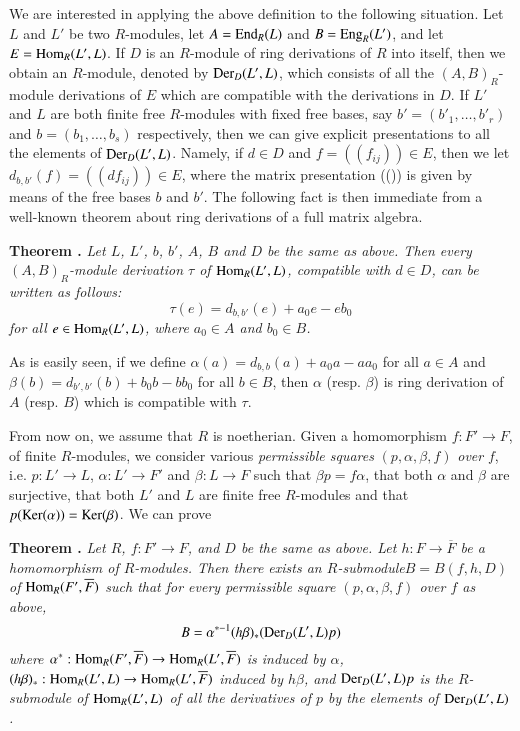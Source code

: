 We are interested in applying the above definition to the following situation. Let $L$ and $L'$ be two $R$-modules, let $A=\operatorname{\mathrm{End}}_{R}(L)$ and $B=\operatorname{\mathrm{Eng}}_{R}(L')$, and let $E=\operatorname{\mathrm{Hom}}_{R}(L',L)$. If $D$ is an $R$-module of ring derivations of $R$ into itself, then we obtain an $R$-module, denoted by $\operatorname{\mathrm{Der}}_{D}(L',L)$, which consists of all the $(A,B)_{R}$-module derivations of $E$ which are compatible with the derivations in $D$. If $L'$ and $L$ are both finite free $R$-modules with fixed free bases, say $b'=(b'_{1},\ldots,b'_{r})$ and $b=(b_{1},\ldots,b_{s})$ respectively, then we can give explicit presentations to all the elements of $\operatorname{\mathrm{Der}}_{D}(L',L)$. Namely, if $d\in D$ and $f=((f_{ij}))\in E$, then we let $d_{b,b'}(f)=((df_{ij}))\in E$, where the matrix presentation ((\quad)) is given by means of the free bases $b$ and $b'$. The following fact is then immediate from a well-known theorem about ring derivations of a full matrix algebra.

\medskip
\noindent
{\bf Theorem .\label{art10-sec1-thm1.3}}
{\em Let $L$, $L'$, $b$, $b'$, $A$, $B$ and $D$ be the same as above. Then every $(A,B)_{R}$-module derivation $\tau$ of $\operatorname{\mathrm{Hom}}_{R}(L',L)$, compatible with $d\in D$, can be written as follows:}
$$
\tau(e)=d_{b,b'}(e)+a_{0}e-eb_{0}
$$
{\em for all $e\in \operatorname{\mathrm{Hom}}_{R}(L',L)$, where $a_{0}\in A$ and $b_{0}\in B$.}
\smallskip

As is easily seen, if we define $\alpha(a)=d_{b,b}(a)+a_{0}a-aa_{0}$ for all $a\in A$ and $\beta(b)=d_{b',b'}(b)+b_{0}b-bb_{0}$ for all $b\in B$, then $\alpha$ (resp. $\beta$) is ring derivation of $A$ (resp. $B$) which is compatible with $\tau$.

From now on, we assume that $R$ is noetherian. Given a homomorphism $f:F'\to F$, of finite $R$-modules, we consider various {\em permissible squares} $(p,\alpha,\beta,f)$ {\em over} $f$, i.e. $p:L'\to L$, $\alpha:L'\to F'$ and $\beta:L\to F$ such that $\beta p=f\alpha$, that both $\alpha$ and $\beta$ are surjective, that both $L'$ and $L$ are finite free $R$-modules and that $p(\operatorname{\mathrm{Ker}}(\alpha))=\operatorname{\mathrm{Ker}}(\beta)$. We can prove

\medskip
\noindent
{\bf Theorem .\label{art10-sec1-thm1.4}}
{\em Let $R$, $f:F'\to F$, and $D$ be the same as above. Let $h:F\to \overline{F}$ be a homomorphism of $R$-modules. Then there exists an $R$-submodule\pageoriginale $B=B(f,h,D)$ of $\operatorname{\mathrm{Hom}}_{R}(F',\overline{F})$ such that for every permissible square $(p,\alpha,\beta,f)$ over $f$ as above,}
$$
B=\alpha^{*-1}(h\beta)_{*}(\operatorname{\mathrm{Der}}_{D}(L',L)p)
$$
{\em where $\alpha^{*}:\operatorname{\mathrm{Hom}}_{R}(F',\overline{F})\to \operatorname{\mathrm{Hom}}_{R}(L',\overline{F})$ is induced by $\alpha$, $(h\beta)_{*}:\operatorname{\mathrm{Hom}}_{R}(L',L)\to \operatorname{\mathrm{Hom}}_{R}(L',\overline{F})$ induced by $h\beta$, and $\operatorname{\mathrm{Der}}_{D}(L',L)p$ is the $R$-submodule of $\operatorname{\mathrm{Hom}}_{R}(L',L)$ of all the derivatives of $p$ by the elements of $\operatorname{\mathrm{Der}}_{D}(L',L)$.}

